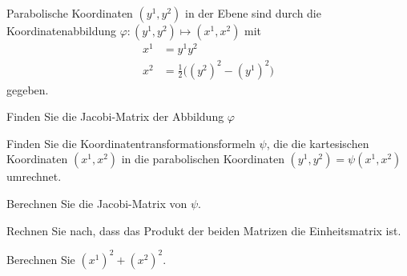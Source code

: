 Parabolische Koordinaten $(y^1,y^2)$ in der Ebene sind durch die
%
Koordinatenabbildung  $\varphi\colon (y^1,y^2)\mapsto (x^1,x^2)$ mit
\begin{align}
x^1 &= y^1y^2
\label{buch:202:eq1}
\\
x^2 &= \frac12\bigl((y^2)^2 - (y^1)^2\bigr)
\label{buch:202:eq2}
\end{align}
gegeben.
\begin{teilaufgaben}
\item 
Finden Sie die Jacobi-Matrix der Abbildung $\varphi$
\item
Finden Sie die Koordinatentransformationsformeln $\psi$, die die
kartesischen Koordinaten $(x^1,x^2)$ in die parabolischen Koordinaten
$(y^1,y^2)=\psi(x^1,x^2)$ umrechnet.
\item
Berechnen Sie die Jacobi-Matrix von $\psi$.
\item
Rechnen Sie nach, dass das Produkt der beiden Matrizen die Einheitsmatrix ist.
\end{teilaufgaben}
%

\begin{hinweis}
Berechnen Sie $(x^1)^2+(x^2)^2$.
\end{hinweis}

